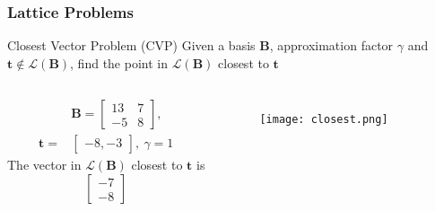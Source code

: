 \documentclass{beamer}
\renewcommand{\v}{\mathbf}
\begin{document}
\begin{frame}
\frametitle{Lattice Problems}
\begin{block}{Closest Vector Problem (CVP)}
    Given a basis $\v{B}$, approximation factor $\gamma$ and 
    $\v{t} \notin \mathcal{L}(\v{B})$, find the point in 
    $\mathcal{L}(\v{B})$ closest to $\v{t}$
\end{block}
\begin{columns}
\begin{align*}
    &\v{B} = \begin{bmatrix}13 & 7 \\ -5 & 8 \end{bmatrix}, \\
    \v{t} = &\begin{bmatrix} -8, -3 \end{bmatrix},\ 
    \gamma = 1
\end{align*}
The vector in $\mathcal{L}(\v{B})$ closest to $\v{t}$ is
\[
    \begin{bmatrix} -7 \\ -8 \end{bmatrix}
\]
\begin{figure}
    \texttt{[image: closest.png]}
\end{figure}
\end{columns}
\end{frame}
\end{document}
